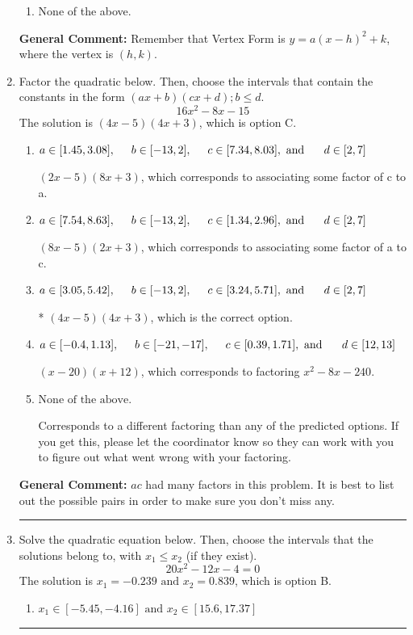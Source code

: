 \documentclass{extbook}[14pt]
\newcommand{\litem}[1]{\item #1

\rule{\textwidth}{0.4pt}}
\begin{document}
\begin{enumerate}
{\begin{enumerate}[label=\Alph*.]
\begin{multicols}{2}
\end{multicols}\item None of the above.\end{enumerate}
\textbf{General Comment:} Remember that Vertex Form is $y = a(x-h)^2+k$, where the vertex is $(h, k)$.
}
\litem{
Factor the quadratic below. Then, choose the intervals that contain the constants in the form $(ax+b)(cx+d); b \leq d.$
\[ 16x^{2} -8 x -15 \]The solution is \( (4x -5)(4x + 3) \), which is option C.\begin{enumerate}[label=\Alph*.]
\item \( a \in [1.45, 3.08], \hspace*{5mm} b \in [-13, 2], \hspace*{5mm} c \in [7.34, 8.03], \text{ and } \hspace*{5mm} d \in [2, 7] \)

 $(2x -5)(8x + 3)$, which corresponds to associating some factor of c to a.
\item \( a \in [7.54, 8.63], \hspace*{5mm} b \in [-13, 2], \hspace*{5mm} c \in [1.34, 2.96], \text{ and } \hspace*{5mm} d \in [2, 7] \)

 $(8x -5)(2x + 3)$, which corresponds to associating some factor of a to c.
\item \( a \in [3.05, 5.42], \hspace*{5mm} b \in [-13, 2], \hspace*{5mm} c \in [3.24, 5.71], \text{ and } \hspace*{5mm} d \in [2, 7] \)

* $(4x -5)(4x + 3)$, which is the correct option.
\item \( a \in [-0.4, 1.13], \hspace*{5mm} b \in [-21, -17], \hspace*{5mm} c \in [0.39, 1.71], \text{ and } \hspace*{5mm} d \in [12, 13] \)

 $(x -20)(x + 12)$, which corresponds to factoring $x^{2} -8 x -240$.
\item \( \text{None of the above.} \)

 Corresponds to a different factoring than any of the predicted options. If you get this, please let the coordinator know so they can work with you to figure out what went wrong with your factoring.
\end{enumerate}

\textbf{General Comment:} $ac$ had many factors in this problem. It is best to list out the possible pairs in order to make sure you don't miss any.
}
\litem{
Solve the quadratic equation below. Then, choose the intervals that the solutions belong to, with $x_1 \leq x_2$ (if they exist).
\[ 20x^{2} -12 x -4 = 0 \]The solution is \( x_1 = -0.239 \text{ and } x_2 = 0.839 \), which is option B.\begin{enumerate}[label=\Alph*.]
\item \( x_1 \in [-5.45, -4.16] \text{ and } x_2 \in [15.6, 17.37] \)


\end{enumerate}}
\end{enumerate}
\end{document}
